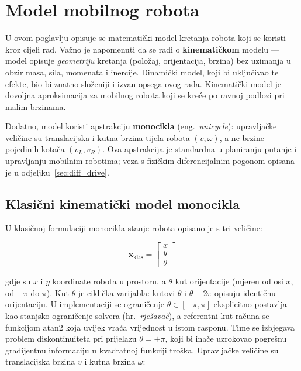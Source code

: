 
\chapter{Model mobilnog robota}
\label{pog:model}

U ovom poglavlju opisuje se matematički model kretanja robota koji se koristi kroz cijeli rad. Važno je napomenuti da se radi o \textbf{kinematičkom} modelu --- model opisuje \textit{geometriju} kretanja (položaj, orijentacija, brzina) bez uzimanja u obzir masa, sila, momenata i inercije. Dinamički model, koji bi uključivao te efekte, bio bi znatno složeniji i izvan opsega ovog rada. Kinematički model je dovoljna aproksimacija za mobilnog robota koji se kreće po ravnoj podlozi pri malim brzinama.

Dodatno, model koristi apstrakciju \textbf{monocikla} (eng.\ \textit{unicycle}): upravljačke veličine su translacijska i kutna brzina tijela robota $(v, \omega)$, a ne brzine pojedinih kotača $(v_L, v_R)$. Ova apstrakcija je standardna u planiranju putanje i upravljanju mobilnim robotima; veza s fizičkim diferencijalnim pogonom opisana je u odjeljku~\ref{sec:diff_drive}.

\section{Klasični kinematički model monocikla}

U klasičnoj formulaciji monocikla \cite{lavalle2006planning} stanje robota opisano je s tri veličine:

\begin{equation}
  \mathbf{x}_{\text{klas}} = \begin{bmatrix} x \\ y \\ \theta \end{bmatrix}
\end{equation}

gdje su $x$ i $y$ koordinate robota u prostoru, a $\theta$ kut orijentacije (mjeren od osi $x$, od $-\pi$ do $\pi$). Kut $\theta$ je ciklička varijabla: kutovi $\theta$ i $\theta + 2\pi$ opisuju identičnu orijentaciju. U implementaciji se ograničenje $\theta \in [-\pi, \pi]$ eksplicitno postavlja kao stanjsko ograničenje solvera (hr.\ \textit{rješavač}), a referentni kut računa se funkcijom $\text{atan2}$ koja uvijek vraća vrijednost u istom rasponu. Time se izbjegava problem diskontinuiteta pri prijelazu $\theta = \pm\pi$, koji bi inače uzrokovao pogrešnu gradijentnu informaciju u kvadratnoj funkciji troška. Upravljačke veličine su translacijska brzina $v$ i kutna brzina $\omega$:

